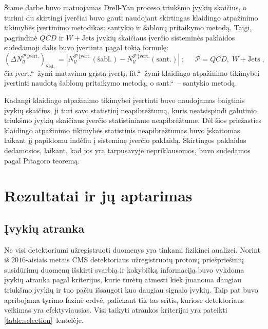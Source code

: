 \documentclass[a4paper, 12pt, oneside]{article}
\newcommand{\WJets}{W\! +\!\mathrm{Jets}}
\newcommand{\ltq}[1]{{\quotedblbase{}#1\textquotedblleft{}}}
\newcommand{\QCD}{QC\! D}
\newlength\q
\begin{document}
Šiame darbe buvo matuojamas Drell-Yan proceso triukšmo įvykių skaičius, o turimi du skirtingi įverčiai buvo gauti naudojant
skirtingas klaidingo atpažinimo tikimybės įvertinimo metodikas: santykio ir šablonų pritaikymo metodą.
Taigi, pagrindinė $\QCD$ ir $\WJets$ įvykių skaičiaus įverčio sisteminės paklaidos sudedamoji dalis buvo įvertinta pagal
tokią formulę:
\begin{equation}
	(\Delta N_{ll}^{\mathcal{P} \; \mathrm{įvert.}})_{\mathrm{Sist.\,}} =
	\left| N_{ll}^{\mathcal{P} \; \mathrm{įvert.}}(\mathrm{šabl.}) -
	N_{ll}^{\mathcal{P} \; \mathrm{įvert.}}(\mathrm{sant.}) \right| \;  ;
	\;\;\;\;\; \mathcal{P} = \QCD, \; \WJets \; ,
	\label{eq:systUncFR}
\end{equation}
čia \ltq{įvert.}\ žymi matavimu grįstą įvertį, \ltq{fit.}\ žymi klaidingo atpažinimo tikimybei įvertinti naudotą šablonų
pritaikymo metodą, o \ltq{sant.}\ -- santykio metodą.

Kadangi klaidingo atpažinimo tikimybei įvertinti buvo naudojamas baigtinis įvykių skaičius, ji turi savo statistinį neapibrėžtumą,
kuris neatsispindi galutinio triukšmo įvykių skaičiaus įverčio statistiniame neapibrėžtume.
Dėl šios priežasties klaidingo atpažinimo tikimybės statistinis neapibrėžtumas buvo įskaitomas laikant jį papildomu indėliu į
sisteminę įverčio paklaidą.
Skirtingos paklaidos dedamosios, laikant, kad jos yra tarpusavyje nepriklausomos, buvo sudedamos pagal Pitagoro teoremą.

\section{Rezultatai ir jų aptarimas}

\subsection{Įvykių atranka}\label{sec:selection}
Ne visi detektoriumi užregistruoti duomenys yra tinkami fizikinei analizei.
Norint iš $2016$-aisiais metais CMS detektoriaus užregistruotų protonų priešpriešinių susidūrimų duomenų išskirti svarbią
ir kokybišką informaciją buvo vykdoma įvykių atranka pagal kriterijus, kurie turėtų atmesti kiek įmanoma daugiau triukšmo
įvykių ir tuo pačiu išsaugoti kuo daugiau signalo įvykių.
Taip pat buvo apribojama tyrimo fazinė erdvė, paliekant tik tas sritis, kuriose detektoriaus veikimas yra efektyviausias.
Visi taikyti atrankos kriterijai yra pateikti \ref{table:selection}~lentelėje.
\end{document}
